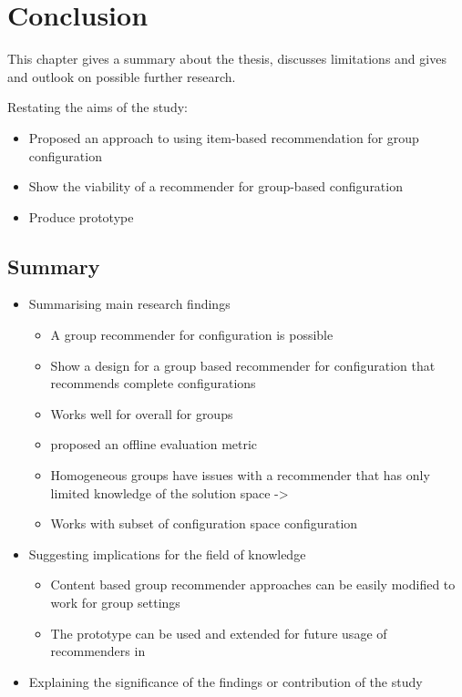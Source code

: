 \chapter{Conclusion}
\label{ch:Conclusion}

This chapter gives a summary about the thesis, discusses limitations and gives and outlook on possible further research.


Restating the aims of the study:
\begin{itemize}
    \item Proposed an approach to using item-based recommendation for group configuration
    \item Show the viability of a recommender for group-based configuration
    \item Produce prototype
\end{itemize}

\section{Summary}
\label{sec:Conclusion:Summary}

\begin{itemize}
    \item Summarising main research findings
        \begin{itemize}
            \item A group recommender for configuration is possible
            \item Show a design for a group based recommender for configuration that recommends complete configurations
            \item Works well for overall for groups
            \item proposed an offline evaluation metric
            \item Homogeneous groups have issues with a recommender that has only limited knowledge of the solution space -> 
            \item Works with subset of configuration space configuration
        \end{itemize}
    \item Suggesting implications for the field of knowledge
        \begin{itemize}
            \item Content based group  recommender approaches can be easily modified to work for group settings
            \item The prototype can be used and extended for future usage of recommenders in  
        \end{itemize}
    \item Explaining the significance of the findings or contribution of the study
\end{itemize}


